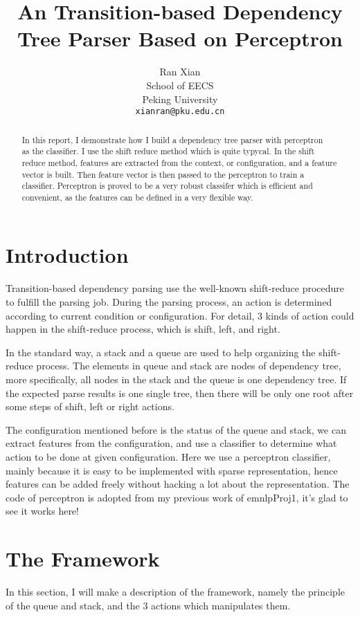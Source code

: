 \documentclass[11pt]{article}
\title{An Transition-based Dependency Tree Parser Based on Perceptron}
\author{Ran Xian \\
  School of EECS \\
  Peking University \\
  {\tt xianran@pku.edu.cn} }
\date{}
\begin{document}
\maketitle
\begin{abstract}
  In this report, I demonstrate how I build a dependency tree parser with perceptron ~\cite{Ros:58} as the classifier. I use the shift reduce method which is quite typycal. In the shift reduce method, features are extracted from the context, or configuration, and a feature vector is built. Then feature vector is then passed to the perceptron to train a classifier. Perceptron is proved to be a very robust classifer which is efficient and convenient, as the features can be defined in a very flexible way.
\end{abstract}

\section{Introduction}

Transition-based dependency parsing use the well-known shift-reduce procedure to fulfill the parsing job. During the parsing process, an action is determined according to current condition or configuration. For detail, 3 kinds of action could happen in the shift-reduce process, which is shift, left, and right.

In the standard way, a stack and a queue are used to help organizing the shift-reduce process. The elements in queue and stack are nodes of dependency tree, more specifically, all nodes in the stack and the queue is one dependency tree. If the expected parse results is one single tree, then there will be only one root after some steps of shift, left or right actions.

The configuration mentioned before is the status of the queue and stack, we can extract features from the configuration, and use a classifier to determine what action to be done at given configuration. Here we use a perceptron classifier, mainly because it is easy to be implemented with sparse representation, hence features can be added freely without hacking a lot about the representation. The code of perceptron is adopted from my previous work of emnlpProj1, it's glad to see it works here!

\section{The Framework}

In this section, I will make a description of the framework, namely the principle of the queue and stack, and the 3 actions which manipulates them. 
\end{document}
